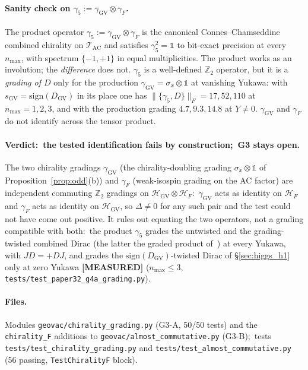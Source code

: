 \documentclass[11pt]{article}
\begin{document}
\paragraph{Sanity check on $\gamma_5 := \gamma_{\mathrm{GV}} \otimes
\gamma_F$.}  The product operator
$\gamma_5 := \gamma_{\mathrm{GV}} \otimes \gamma_F$ is the canonical
Connes--Chamseddine combined chirality on $\mathcal{T}_{\mathrm{AC}}$
and satisfies $\gamma_5^2 = \mathbb{1}$ to bit-exact precision at
every $n_{\max}$, with spectrum $\{-1, +1\}$ in equal multiplicities.
The product works as an involution; the \emph{difference} does not.
$\gamma_5$ is a well-defined $\mathbb{Z}_2$ operator, but it is a
\emph{grading of $D$} only for the production $\gamma_{\mathrm{GV}} =
\sigma_x \otimes \mathbb{1}$ at vanishing Yukawa: with
$s_{\mathrm{GV}} = \mathrm{sign}(D_{\mathrm{GV}})$ in its place one has
$\|\{\gamma_5, D\}\|_F = 17, 52, 110$ at $n_{\max} = 1, 2, 3$, and with
the production grading $4.7, 9.3, 14.8$ at $Y \ne 0$.  $\gamma_{\mathrm{GV}}$ and $\gamma_F$ do not
identify across the tensor product.

\paragraph{Verdict:\ the tested identification fails by construction;\
G3 stays open.}  The two chirality
gradings $\gamma_{\mathrm{GV}}$ (the chirality-doubling grading
$\sigma_x \otimes \mathbb{1}$ of Proposition~\ref{prop:odd}(b)) and $\gamma_F$ (weak-isospin grading on the AC factor) are
independent commuting $\mathbb{Z}_2$ gradings on
$\mathcal{H}_{\mathrm{GV}} \otimes \mathcal{H}_F$:\ $\gamma_{\mathrm{GV}}$ acts as identity on
$\mathcal{H}_F$ and $\gamma_F$ acts as identity on
$\mathcal{H}_{\mathrm{GV}}$, so $\Delta \neq 0$ for any such pair and
the test could not have come out positive.  It rules out equating the
two operators, not a grading compatible with both:\ the product
$\gamma_5$ grades the untwisted and the grading-twisted combined Dirac
(the latter the graded product of~\cite{dabrowski_dossena2011}) at every
Yukawa, with $JD = +DJ$, and grades the $\mathrm{sign}(D_{\mathrm{GV}})$-twisted
Dirac of \S\ref{sec:higgs_h1} only at zero Yukawa \textbf{[MEASURED]}
($n_{\max} \le 3$, \texttt{tests/test\_paper32\_g4a\_grading.py}).

\paragraph{Files.}  Modules
\texttt{geovac/chirality\_grading.py} (G3-A, 50/50 tests) and the
\texttt{chirality\_F} additions to
\texttt{geovac/almost\_commutative.py} (G3-B);\ tests
\texttt{tests/test\_chirality\_grading.py} and
\texttt{tests/test\_almost\_commutative.py} (56 passing,
\texttt{TestChiralityF} block).
\end{document}
